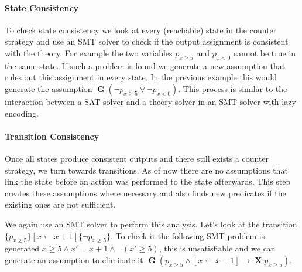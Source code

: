 \documentclass[runningheads]{llncs}
\newcommand{\globally}{\operatorname{\mathbf{G}}}
\newcommand{\lnext}{\operatorname{\mathbf{X}}}
\newcommand{\updf}{\mathbf{u}}
\begin{document}



\paragraph{State Consistency}
To check state consistency we look at every (reachable) state in the counter strategy and use an SMT solver to check if the output assignment is consistent with the theory. For example the two variables $p_{x\geq5}$ and $p_{x<0}$ cannot be true in the same state.
If such a problem is found we generate a new assumption that rules out this assignment in every state. In the previous example this would generate the assumption $\globally(\neg p_{x\geq5} \vee \neg p_{x<0})$. This process is similar to the interaction between a SAT solver and a theory solver in an SMT solver with lazy encoding.

\paragraph{Transition Consistency} Once all states produce consistent outputs and there still exists a counter strategy, we turn towards transitions. As of now there are no assumptions that link the state before an action was performed to the state afterwards. This step creates these assumptions where necessary and also finds new predicates if the existing ones are not sufficient.

We again use an SMT solver to perform this analysis. Let's look at the transition $\{p_{x\geq5}\} [x \leftarrow x+1] \{\neg p_{x\geq5}\}$. To check it the following SMT problem is generated $x\geq5 \land x'=x+1 \land \neg(x'\geq5)$, this is unsatisfiable and we can generate an assumption to eliminate it $\globally(p_{x\geq5} \land [x \leftarrow x+1] \rightarrow \lnext p_{x\geq5})$. 
\end{document}
